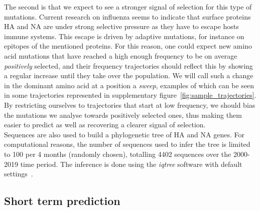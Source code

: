 \documentclass{article}
\begin{document}
	The second is that we expect to see a stronger signal of selection for this type of mutations. Current research on influenza seems to indicate that surface proteins HA and NA are under strong selective pressure as they have to escape hosts immune systems. This escape is driven by adaptive mutations, for instance on epitopes of the mentioned proteins. For this reason, one could expect new amino acid mutations that have reached a high enough frequency to be on average \emph{positively} selected, and their frequency trajectories should reflect this by showing a regular increase until they take over the population. We will call such a change in the dominant amino acid at a position a \emph{sweep}, examples of which can be seen in some trajectories represented in supplementary figure~\ref{fig:sample_trajectories}. By restricting ourselves to trajectories that start at low frequency, we should bias the mutations we analyse towards positively selected ones, thus making them easier to predict as well as recovering a clearer signal of selection. \\

	Sequences are also used to build a phylogenetic tree of HA and NA genes. For computational reasons, the number of sequences used to infer the tree is limited to 100 per 4 months (randomly chosen), totalling 4402 sequences over the 2000-2019 time period. The inference is done using the \emph{iqtree} software with default settings~\cite{10.1093/molbev/msaa015,10.1093/molbev/msu300}. \\

	\subsection*{Short term prediction}
\end{document}
